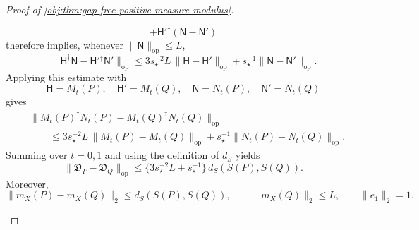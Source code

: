 \begin{proof}[Proof of \cref{obj:thm:gap-free-positive-measure-modulus}]
\begin{enumerate}
\[+\mathsf H'{}^\dagger(\mathsf N-\mathsf N')
\]
therefore implies, whenever \(\|\mathsf N\|_{\mathrm{op}}\le L\),
\[
\|\mathsf H^\dagger\mathsf N-\mathsf H'{}^\dagger\mathsf N'\|_{\mathrm{op}}
\le
3s_\star^{-2}L\,\|\mathsf H-\mathsf H'\|_{\mathrm{op}}
+s_\star^{-1}\|\mathsf N-\mathsf N'\|_{\mathrm{op}} .
\]
Applying this estimate with
\[
\mathsf H=M_t(P),\quad \mathsf H'=M_t(Q),\quad
\mathsf N=N_t(P),\quad \mathsf N'=N_t(Q)
\]
gives
\[
\begin{aligned}
&\|M_t(P)^\dagger N_t(P)-M_t(Q)^\dagger N_t(Q)\|_{\mathrm{op}}\\
&\qquad\le
3s_\star^{-2}L\,\|M_t(P)-M_t(Q)\|_{\mathrm{op}}
+s_\star^{-1}\|N_t(P)-N_t(Q)\|_{\mathrm{op}} .
\end{aligned}
\]
Summing over \(t=0,1\) and using the definition of \(d_S\) yields
\[
\|\mathfrak D_P-\mathfrak D_Q\|_{\mathrm{op}}
\le
\{3s_\star^{-2}L+s_\star^{-1}\}\,
d_S(S(P),S(Q)).
\]
Moreover,
\[
\|m_X(P)-m_X(Q)\|_2\le d_S(S(P),S(Q)),
\qquad
\|m_X(Q)\|_2\le L,
\qquad
\|e_1\|_2=1 .
\]


\end{enumerate}
\end{proof}
